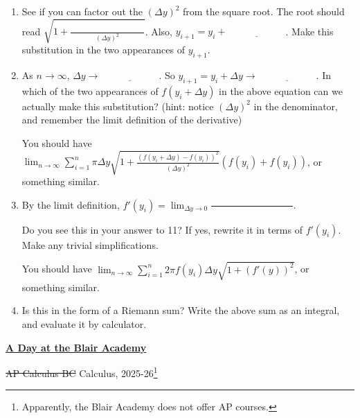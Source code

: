 \documentclass{article}
\begin{document}
\begin{itemize}[topsep=0pt]
\begin{enumerate}
	\item See if you can factor out the $(\Delta y)^2$ from the square root. The root should read $\displaystyle \sqrt{1+\frac{\phantom{(f(y_{i+1})-f(y_1))^2}}{(\Delta y)^2}}$. Also, $y_{i+1}=y_i+\underline{\hspace{1in}}$. Make this substitution in the two appearances of $y_{i+1}$.
		\vspace{1in}

	\item As $n\to\infty$, $\Delta y\to \underline{\hspace{1in}}$. So $y_{i+1}=y_i+\Delta y\to \underline{\hspace{1in}}$. In which of the two appearances of $f(y_i+\Delta y)$ in the above equation can we actually make this substitution? (hint: notice $(\Delta y)^2$ in the denominator, and remember the limit definition of the derivative)
		\vspace{1in}
		\begin{mdframed}
			You should have $\displaystyle \lim_{n\to\infty}\sum_{i=1}^{n}\pi \Delta y \sqrt{1+\frac{\left( f(y_i+\Delta y)-f(y_i) \right)^2}{(\Delta y)^2}}\left( f(y_i)+f(y_i) \right)$, or something similar.
		\end{mdframed}

		\vspace{0.125in}
	\item By the limit definition, $\displaystyle f'(y_i)=\lim_{\Delta y\to0}\frac{\hspace{2in}}{\hspace{2in}}$. 
		\vspace{0.125in}

	Do you see this in your answer to 11? If yes, rewrite it in terms of $f'(y_i)$. Make any trivial simplifications.
		\vspace{1in}

		\begin{mdframed}
			You should have $\displaystyle \lim_{n\to\infty}\sum_{i=1}^{n}2\pi f(y_i) \Delta y \sqrt{1+(f'(y))^2}$, or something similar.
		\end{mdframed}
	
		\item Is this in the form of a Riemann sum? Write the above sum as an integral, and evaluate it by calculator.
	\end{enumerate}
\end{itemize}


\newpage
{}

\begin{center}
	\textbf{\underline{A Day at the Blair Academy}}

	\st{AP Calculus BC} Calculus, 2025-26\footnote{Apparently, the Blair Academy does not offer AP courses.}
\end{center}
\end{document}
